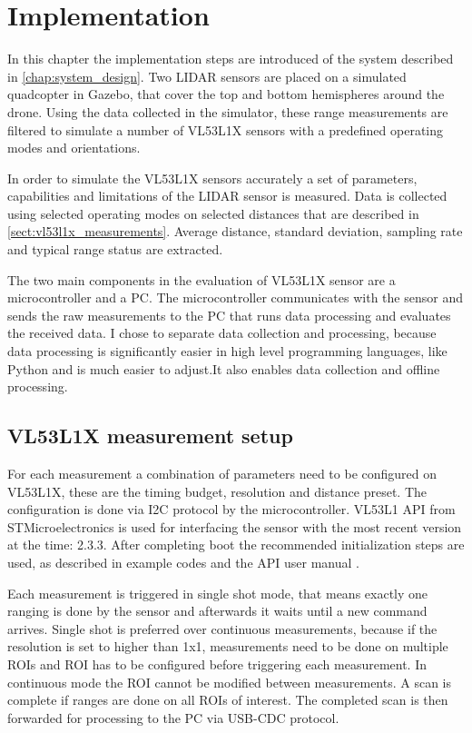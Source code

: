 \chapter{Implementation} \label{chap:implementation}
In this chapter the implementation steps are introduced of the system described in 
\ref{chap:system_design}. Two LIDAR sensors are placed on a simulated quadcopter in Gazebo, 
that cover the top and bottom hemispheres around the drone. Using the data collected in the
simulator, these range measurements are filtered to simulate a number of VL53L1X sensors with 
a predefined operating modes and orientations. 

In order to simulate the VL53L1X sensors accurately a set of parameters, capabilities and 
limitations of the LIDAR sensor is measured. Data is collected using selected operating modes
on selected distances that are described in \ref{sect:vl53l1x_measurements}. Average distance,
standard deviation, sampling rate and typical range status are extracted. 

The two main components in the evaluation of VL53L1X sensor are a microcontroller and a PC. The 
microcontroller communicates with the sensor and sends the raw measurements to the PC that runs 
data processing and evaluates the received data. I chose to separate data collection and processing,
because data processing is significantly easier in high level programming languages, like Python and 
is much easier to adjust.It also enables data collection and offline processing.


\section{VL53L1X measurement setup}
For each measurement a combination of parameters need to be configured on VL53L1X, these are the 
timing budget, resolution and distance preset. The configuration is done via I2C protocol by the
microcontroller. VL53L1 API from STMicroelectronics is used for interfacing the sensor with the most
recent version at the time: 2.3.3. After completing boot the recommended initialization steps are 
used, as described in example codes and the API user manual \cite{VL53L1XAPIManual}.

Each measurement is triggered in single shot mode, that means exactly one ranging is done by the 
sensor and afterwards it waits until a new command arrives.  Single shot is preferred over continuous
measurements, because if the resolution is set to higher than 1x1, measurements need to be done on 
multiple ROIs and ROI has to be configured before triggering each measurement. In continuous mode 
the ROI cannot be modified between measurements.
A scan is complete if ranges are done on all ROIs of interest. The completed scan is then forwarded 
for processing to the PC via USB-CDC protocol.

